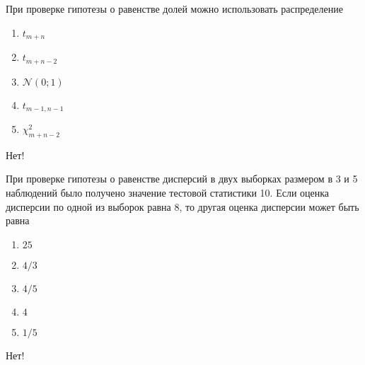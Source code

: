 \documentclass[t]{beamer}
\newcommand{\cN}{\mathcal{N}}
\begin{document}
 \begin{frame} \label{6-No} 
\begin{block}{6} 

  При проверке гипотезы о равенстве долей можно использовать распределение


 \end{block} 
\begin{enumerate} 
\item[] \hyperlink{6-No}{\beamergotobutton{} $t_{m+n}$}
\item[] \hyperlink{6-No}{\beamergotobutton{} $t_{m+n-2}$}
\item[] \hyperlink{6-Yes}{\beamergotobutton{} $\cN(0;1)$}
\item[] \hyperlink{6-No}{\beamergotobutton{} $t_{m-1,n-1}$}
\item[] \hyperlink{6-No}{\beamergotobutton{} $\chi^2_{m+n-2}$}
\end{enumerate} 

 \alert{Нет!} 
\end{frame} 


 \begin{frame} \label{7-No} 
\begin{block}{7} 

   При проверке гипотезы о равенстве дисперсий в двух выборках размером в 3 и 5 наблюдений было получено значение тестовой статистики 10. Если оценка дисперсии по одной из выборок равна 8, то другая оценка дисперсии может быть равна


 \end{block} 
\begin{enumerate} 
\item[] \hyperlink{7-No}{\beamergotobutton{} $25$}
\item[] \hyperlink{7-No}{\beamergotobutton{} $4/3$}
\item[] \hyperlink{7-Yes}{\beamergotobutton{} $4/5$}
\item[] \hyperlink{7-No}{\beamergotobutton{} $4$}
\item[] \hyperlink{7-No}{\beamergotobutton{} $1/5$}
\end{enumerate} 

 \alert{Нет!} 
\end{frame} 
\end{document}
